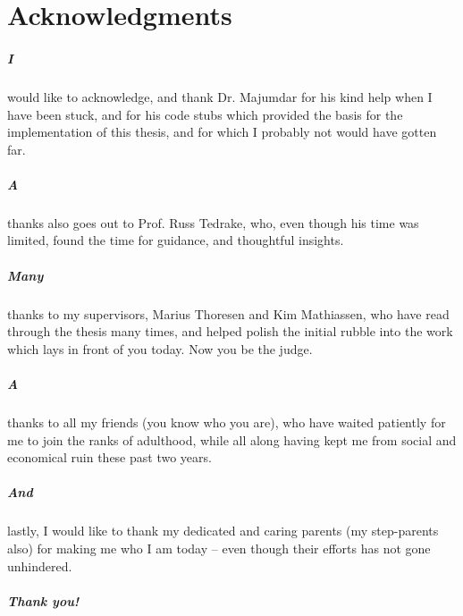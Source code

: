 \chapter{Acknowledgments}

\paragraph{I} would like to acknowledge, and thank Dr. Majumdar for his kind
help when I have been stuck, and for his code stubs which provided the basis for
the implementation of this thesis, and for which I probably not would have
gotten far.


\paragraph{A} thanks also goes out to Prof. Russ Tedrake, who, even though his
time was limited, found the time for guidance, and thoughtful insights.

\paragraph{Many} thanks to my supervisors, Marius Thoresen and Kim Mathiassen,
who have read through the thesis many times, and helped polish the initial
rubble into the work which lays in front of you today. Now you be the judge.

\paragraph{A} thanks to all my friends (you know who you are), who have waited
patiently for me to join the ranks of adulthood, while all along having kept me
from social and economical ruin these past two years.


\paragraph{And} lastly, I would like to thank my dedicated and caring parents
(my step-parents also) for making me who I am today -- even though their efforts
has not gone unhindered.


\paragraph{Thank you!}
